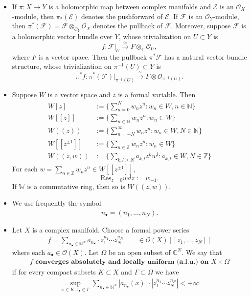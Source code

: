 \documentclass[11pt,b5paper,notitlepage]{article}
\theoremstyle{definition}
\theoremstyle{plain}
\newcommand{\Res}{\mathrm{Res}}
\newcommand{\scr}{\mathscr}
\newcommand{\blt}{\bullet}
\newcommand{\Wbb}{\mathbb W}
\newcommand{\Cbb}{\mathbb C}
\newcommand{\Nbb}{\mathbb N}
\newcommand{\Zbb}{\mathbb Z}
\newcommand{\<}{\left\langle}
\renewcommand{\>}{\right\rangle}
\newcommand{\MO}{\mathcal{O}}
\newcommand{\ME}{\mathcal{E}}
\newcommand{\MF}{\mathcal{F}}
\numberwithin{equation}{section}
\begin{document}
\begin{subappendices}
\begin{itemize}
    \item If $\pi:X\rightarrow Y$ is a holomorphic map between complex manifolds and $\ME$ is an $\MO_X$-module, then $\pi_*(\ME)$ denotes the pushforward of $\ME$. If $\MF$ is an $\MO_Y$-module, then $\pi^*(\MF)=\MF\otimes_{\MO_Y}\MO_X$ denotes the pullback of $\MF$. Moreover, suppose $\MF$ is a holomorphic vector bundle over $Y$, whose trivialization on $U\subset Y$ is 
    $$
    f:\MF\vert_U\xrightarrow{\simeq} F\otimes_\Cbb \MO_U,
    $$
    where $F$ is a vector space. Then the pullback $\pi^*\MF$ has a natural vector bundle structure, whose trivialization on $\pi^{-1}(U)\subset Y$ is 
    $$
    \pi^*f:\pi^*(\MF)\vert_{\pi^{-1}(U)}\xrightarrow{\simeq} F\otimes \MO_{\pi^{-1}(U)}.
    $$
    \item Suppose $W$ is a vector space and $z$ is a formal variable. Then 
    $$
    \begin{aligned}
    W[z]&:=\{\sum_{n=0}^N w_n z^n:w_n\in W,n\in \Nbb\}\\
    W[[z]]&:=\{\sum_{n\in \Nbb}w_nz^n:w_n\in W\}\\
    W((z))&:=\{\sum_{n=-N}^{\infty}w_nz^n:w_n\in W,N\in \Nbb\}\\
    W[[z^{\pm 1}]]&:=\{\sum_{n\in \Zbb}w_nz^n:w_n\in W\}\\
    W((z,w))&:=\{\sum_{k,l\geq N}a_{k,l}z^k w^l:a_{k,l}\in W,N\in \Zbb\}
    \end{aligned}
    $$
    For each $w=\sum_{n\in \Zbb}w_nz^n\in W[[z^{\pm 1}]]$, 
    $$
    \Res_{z=0}wdz:=w_{-1}.
    $$
    If $\Wbb$ is a commutative ring, then so is $W((z,w))$.
\item We use frequently the symbol \index{n@$n_\blt=(n_1,\dots,n_N).$}
\begin{align}\label{eq33}
n_\blt=(n_1,\dots,n_N).
\end{align}
\item Let $X$ is a complex manifold. Choose a formal power series 
\begin{align*}
f=\sum_{n_\blt\in\Nbb^N}a_{n_\blt}\cdot z_1^{n_1}\cdots z_N^{n_N}\qquad\in\scr O(X)[[z_1,\dots,z_N]]
\end{align*}
where each $a_{\blt}\in\scr O(X)$. Let $\Omega$ be an open subset of $\Cbb^N$. We say that 
\begin{align}\label{eq34}
f\textbf{ converges absolutely and locally uniform (a.l.u.) on } X\times\Omega
\end{align}
if for every compact subsets $K\subset X$ and $\Gamma\subset \Omega$ we have
\begin{align*}
\sup_{x\in K,z_\blt\in\Gamma}\sum_{n_\blt\in\Nbb^N} |a_{n_\blt}(x)|\cdot |z_1^{n_1}\cdots z_N^{n_N}|<+\infty
\end{align*}
\end{itemize}

\end{subappendices}
\end{document}
